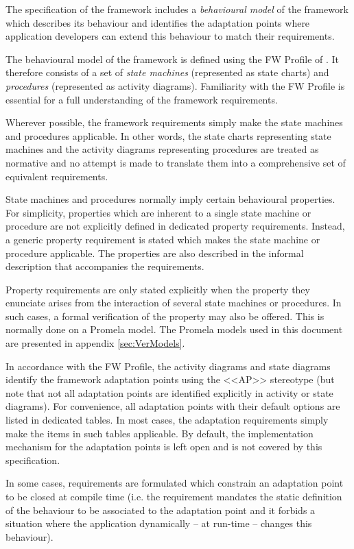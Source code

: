 \documentclass[a4paper,10pt]{article}
\begin{document}
The specification of the framework includes a \textit{behavioural model} of the framework which describes its behaviour and identifies the adaptation points where application developers can extend this behaviour to match their requirements.  

The behavioural model of the framework is defined using the FW Profile of \cite{ref:fwprofile}. 
It therefore consists of a set of \textit{state machines} (represented as state charts) and \textit{procedures} (represented as  activity diagrams). 
Familiarity with the FW Profile is essential for a full understanding of the framework requirements.

Wherever possible, the framework requirements simply make the state machines and procedures applicable. In other words, the state charts representing state machines and the activity diagrams representing procedures are treated as normative and no attempt is made to translate them into a comprehensive set of equivalent requirements.

State machines and procedures normally imply certain behavioural properties. 
For simplicity, properties which are inherent to a single state machine or procedure are not explicitly defined in dedicated property requirements. 
Instead, a generic property requirement is stated which makes the state machine or procedure applicable. 
The properties are also described in the informal description that accompanies the requirements.

Property requirements are only stated explicitly when the property they enunciate arises from the interaction of several state machines or procedures. 
In such cases, a formal verification of the property may also be offered. 
This is normally done on a Promela model. 
The Promela models used in this document are presented in appendix \ref{sec:VerModels}.

In accordance with the FW Profile, the activity diagrams and state diagrams identify the framework adaptation points using the <<AP>> stereotype (but note that not all adaptation points are identified explicitly in activity or state diagrams). 
For convenience, all adaptation points with their default options are listed in dedicated tables. 
In most cases, the adaptation requirements simply make the items in such tables applicable. By default, the implementation mechanism for the adaptation points is left open and is not covered by this specification. 

In some cases, requirements are formulated which constrain an adaptation point to be closed at compile time (i.e. the requirement mandates the static definition of the behaviour to be associated to the adaptation point and it forbids a situation where the application dynamically – at run-time – changes this behaviour). 
 
\end{document}
